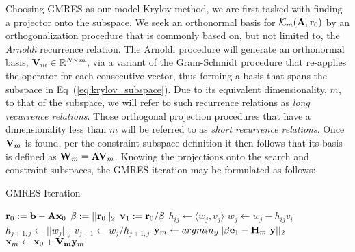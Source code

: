 Choosing GMRES as our model Krylov method, we are first tasked with
finding a projector onto the subspace. We seek an orthonormal basis
for $\mathcal{K}_m(\mathbf{A},\mathbf{r}_0)$ by an orthogonalization procedure
that is commonly based on, but not limited to, the \textit{Arnoldi}
recurrence relation. The Arnoldi procedure will generate an
orthonormal basis, $\mathbf{V}_m \in \mathbb{R}^{N \times m}$, via a
variant of the Gram-Schmidt procedure that re-applies the operator for
each consecutive vector, thus forming a basis that spans the subspace
in Eq~(\ref{eq:krylov_subspace}). Due to its equivalent
dimensionality, $m$, to that of the subspace, we will refer to such
recurrence relations as \textit{long recurrence relations}. Those
orthogonal projection procedures that have a dimensionality less than
$m$ will be referred to as \textit{short recurrence relations}.  Once
$\mathbf{V}_m$ is found, per the constraint subspace definition it then
follows that its basis is defined as $\mathbf{W}_m = \mathbf{A}
\mathbf{V}_m$. Knowing the projections onto the search and constraint
subspaces, the GMRES iteration may be formulated as follows:
\begin{algorithm}[htpb!]
  \caption{GMRES Iteration}
  \label{alg:gmres}
  \begin{algorithmic}
    \State $\mathbf{r}_0 := \mathbf{b}-\mathbf{A}\mathbf{x}_0$
    \State $\beta := ||\mathbf{r}_0||_2$
    \State $\mathbf{v}_1 := \mathbf{r}_0 / \beta$
    \State $h_{ij} \leftarrow \langle w_j,v_j \rangle$
    \State $w_j \leftarrow w_j - h_{ij}v_i$
    \EndFor
    \State $h_{j+1,j} \leftarrow ||w_j||_2$
    \State $v_{j+1} \leftarrow w_j / h_{j+1,j}$
    \State $\mathbf{y}_m \leftarrow argmin_y ||\beta \mathbf{e}_1 - \mathbf{H}_m\
    \mathbf{y}||_2 $
    \State $\mathbf{x}_m \leftarrow \mathbf{x}_0 + \mathbf{V_m} \mathbf{y}_m$
  \end{algorithmic}
\end{algorithm}

